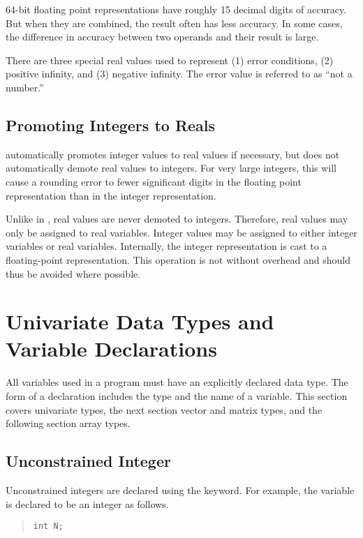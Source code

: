 64-bit floating point representations have roughly 15 decimal digits
of accuracy.  But when they are combined, the result often has less
accuracy.  In some cases, the difference in accuracy between two
operands and their result is large.

There are three special real values used to represent (1) error
conditions, (2) positive infinity, and (3) negative infinity.  The
error value is referred to as ``not a number.''

\subsection{Promoting Integers to Reals}

\Stan automatically promotes integer values to real values if
necessary, but does not automatically demote real values to integers.
For very large integers, this will cause a rounding error to fewer
significant digits in the floating point representation than in the
integer representation.

Unlike in \Cpp, real values are never demoted to integers.  Therefore,
real values may only be assigned to real variables.  Integer values
may be assigned to either integer variables or real variables.
Internally, the integer representation is cast to a floating-point
representation.  This operation is not without overhead and should
thus be avoided where possible.


\section{Univariate Data Types and Variable Declarations}

All variables used in a \Stan program must have an explicitly declared
data type.  The form of a declaration includes the type and the name
of a variable.  This section covers univariate types, the next section
vector and matrix types, and the following section array types.

\subsection{Unconstrained Integer}

Unconstrained integers are declared using the  keyword.
For example, the variable  is declared to be an integer as follows.
%
\begin{quote}
\begin{Verbatim} 
int N;
\end{Verbatim}
\end{quote}
% 

